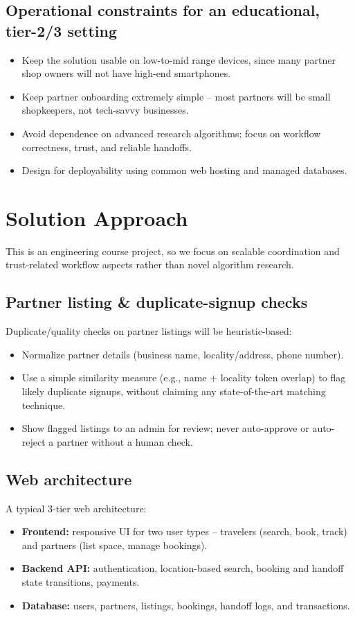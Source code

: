 \documentclass[11pt,a4paper]{article}
\begin{document}
\subsection{Operational constraints for an educational, tier-2/3 setting}
\begin{itemize}[leftmargin=0.7cm]
    \item Keep the solution usable on low-to-mid range devices, since many partner shop owners will not have high-end smartphones.
    \item Keep partner onboarding extremely simple -- most partners will be small shopkeepers, not tech-savvy businesses.
    \item Avoid dependence on advanced research algorithms; focus on workflow correctness, trust, and reliable handoffs.
    \item Design for deployability using common web hosting and managed databases.
\end{itemize}

\section{Solution Approach}
This is an engineering course project, so we focus on scalable coordination and trust-related workflow aspects rather than novel algorithm research.

\subsection{Partner listing \& duplicate-signup checks}
Duplicate/quality checks on partner listings will be heuristic-based:
\begin{itemize}[leftmargin=0.7cm]
    \item Normalize partner details (business name, locality/address, phone number).
    \item Use a simple similarity measure (e.g., name + locality token overlap) to flag likely duplicate signups, without claiming any state-of-the-art matching technique.
    \item Show flagged listings to an admin for review; never auto-approve or auto-reject a partner without a human check.
\end{itemize}

\subsection{Web architecture}
A typical 3-tier web architecture:
\begin{itemize}[leftmargin=0.7cm]
    \item \textbf{Frontend:} responsive UI for two user types -- travelers (search, book, track) and partners (list space, manage bookings).
    \item \textbf{Backend API:} authentication, location-based search, booking and handoff state transitions, payments.
    \item \textbf{Database:} users, partners, listings, bookings, handoff logs, and transactions.
\end{itemize}
\end{document}
